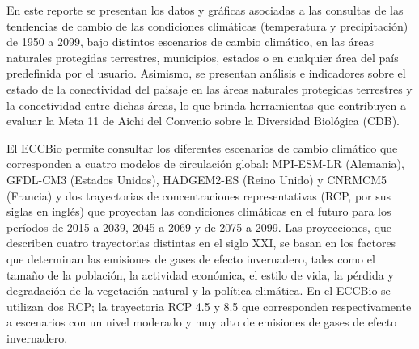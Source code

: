 \documentclass{article}
\begin{document}
	En este reporte se presentan los datos y gr\'aficas asociadas a las consultas de las tendencias de cambio de las condiciones clim\'aticas (temperatura y precipitaci\'on) de 1950 a 2099, bajo distintos escenarios de cambio clim\'atico, en las \'areas naturales protegidas terrestres, municipios, estados o en cualquier \'area del pa\'is predefinida por el usuario. Asimismo, se presentan an\'alisis e indicadores sobre el estado de la conectividad del paisaje en las \'areas naturales protegidas terrestres y la conectividad entre dichas \'areas, lo que brinda herramientas que contribuyen a evaluar la Meta 11 de Aichi del Convenio sobre la Diversidad Biol\'ogica (CDB).

	El ECCBio permite consultar los diferentes escenarios de cambio clim\'atico que corresponden a cuatro modelos de circulaci\'on global: MPI-ESM-LR (Alemania), GFDL-CM3 (Estados Unidos), HADGEM2-ES (Reino Unido) y CNRMCM5 (Francia) y dos trayectorias de concentraciones representativas (RCP, por sus siglas en ingl\'es) que proyectan las condiciones clim\'aticas en el futuro para los per\'iodos de 2015 a 2039, 2045 a 2069 y de 2075 a 2099. Las proyecciones, que describen cuatro trayectorias distintas en el siglo XXI, se basan en los factores que determinan las emisiones de gases de efecto invernadero, tales como el tama\~no de la poblaci\'on, la actividad econ\'omica, el estilo de vida, la p\'erdida y degradaci\'on de la vegetaci\'on natural y la pol\'itica clim\'atica. En el ECCBio se utilizan dos RCP; la trayectoria RCP 4.5 y 8.5 que corresponden respectivamente a escenarios con un nivel moderado y muy alto de emisiones de gases de efecto invernadero.


	\newpage
	\tableofcontents






\end{document}
